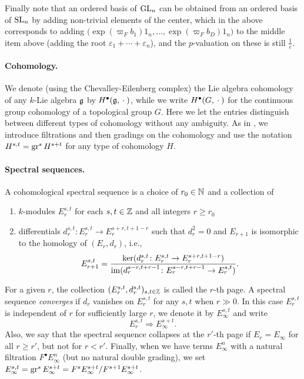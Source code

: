 Finally note that an ordered basis of $\operatorname{GL}_{n}$ can be obtained from an ordered basis of $\operatorname{SL}_{n}$ by adding non-trivial elements of the center, which in the above corresponds to adding $\bigl(  \exp(\varpi_{F}b_{1})1_{n}, \dotsc, \exp(\varpi_{F}b_{D})1_{n} \bigr)$ to the middle item above (adding the root $\varepsilon_{1} + \dotsb + \varepsilon_{n}$), and the $p$-valuation on these is still $\frac{1}{e}$.

\paragraph{Cohomology.} We denote (using the Chevalley-Eilenberg complex) the Lie algebra cohomology of any $k$-Lie algebra $\mathfrak{g}$ by $H^{\bullet}(\mathfrak{g}, \:\cdot\:)$, while we write $H^{\bullet}(G,\:\cdot\:)$ for the continuous group cohomology of a topological group $G$. Here we let the entries distinguish between different types of cohomology without any ambiguity. As in , we introduce filtrations and then gradings on the cohomology and use the notation $H^{s,t} = \operatorname{gr}^{s}H^{s+t}$ for any type of cohomology $H$.

\paragraph{Spectral sequences.} A cohomological spectral sequence is a choice of $r_0 \in \mathbb{N}$ and a collection of
\begin{enumerate}[$\bullet$]
  \item $k$-modules $E_r^{s,t}$ for each $s,t \in \mathbb{Z}$ and all integers $r \geq r_0$
  \item differentials $d_r^{s,t} \colon E_r^{s,t} \to E_r^{s+r,t+1-r}$ such that $d_r^2 = 0$ and $E_{r+1}$ is isomorphic to the homology of $(E_r,d_r)$, i.e.,
  \[
    E_{r+1}^{s,t} = \frac{\operatorname{ker}(d_r^{s,t} \colon E_r^{s,t} \to E_r^{s+r,t+1-r})}{\operatorname{im}(d_r^{s-r,t+r-1} \colon E_r^{s-r,t+r-1} \to E_r^{s,t})}.
  \]
\end{enumerate}
For a given $r$, the collection $(E_r^{s,t},d_r^{s,t})_{s,t\in\mathbb{Z}}$ is called the $r$-th page. A spectral sequence \emph{converges} if $d_r$ vanishes on $E_r^{s,t}$ for any $s,t$ when $r\gg0$. In this case $E_r^{s,t}$ is independent of $r$ for sufficiently large $r$, we denote it by $E_{\infty}^{s,t}$ and write
  \[
    E_{r}^{s,t} \Longrightarrow E_\infty^{s+t}.
  \]
Also, we say that the spectral sequence collapses at the $r'$-th page if $E_{r} = E_{\infty}$ for all $r \geq r'$, but not for $r < r'$. Finally, when we have terms $E_\infty^{n}$  with a natural filtration $F^\bullet E_\infty^n$ (but no natural double grading), we set $E_\infty^{s,t} = \operatorname{gr}^{s} E_\infty^{s+t}= F^{s}E_\infty^{s+t}/F^{s+1}E_\infty^{s+t}$.

